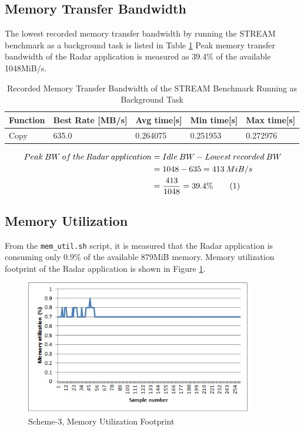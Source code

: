 \subsection{Memory Transfer Bandwidth}
\label{ss:mm:scheme4:bw_util}
The lowest recorded memory transfer bandwidth by running the STREAM benchmark as a background task is listed in Table \ref{tbl:mm:scheme4_mem_bw} 
Peak memory transfer bandwidth of the Radar application is measured as 39.4\% of the available 1048MiB/s.

\begin{table}[h!]
	\centering
	\begin{tabular}{|l|l|l|l|l|} 
	 \hline
	 \textbf{Function} & \textbf{Best Rate [MB/s]} & \textbf{Avg time[s]} & \textbf{Min time[s]} & \textbf{Max time[s]} \\
	 \hline
	 Copy & 635.0 &0.264075 & 0.251953 & 0.272976 \\ \hline
	\end{tabular}
	\caption{Recorded Memory Transfer Bandwidth of the STREAM Benchmark Running as Background Task}
	\label{tbl:mm:scheme4_mem_bw}
\end{table}

\begin{align*}
\label{aa:scheme4:mem_bw}
	Peak \: BW \: of \: the \: Radar \: application &= Idle \: BW - Lowest \: recorded \: BW \\
	&= 1048 - 635 = 413 \: MiB/s \\
	&= \frac{413}{1048} = 39.4 \% \stepcounter{equation}\tag{\theequation} 
\end{align*}

\subsection{Memory Utilization}
\label{ss:mm:scheme4:mem_util}
From the \verb|mem_util.sh| script, it is measured that the Radar application is consuming only 0.9\% of the available 879MiB memory. Memory utilization footprint of the Radar application is shown in Figure \ref{fig:mm:scheme4_mem_util}.

\begin{figure}[h!]
	\centering
	\includegraphics[width=100mm]{figures/scheme4_mem_util}
	\caption{Scheme-3, Memory Utilization Footprint}
	\label{fig:mm:scheme4_mem_util}
\end{figure}

